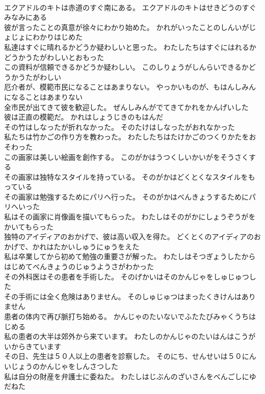 \documentclass[8pt]{extreport}
\begin{document}
\begin{CJK}{UTF8}{min}
\\	エクアドルのキトは赤道のすぐ南にある。	エクアドルのキトはせきどうのすぐみなみにある 
\\	彼が言ったことの真意が徐々にわかり始めた。	かれがいったことのしんいがじょじょにわかりはじめた 
\\	私達はすぐに晴れるかどうか疑わしいと思った。	わたしたちはすぐにはれるかどうかうたがわしいとおもった 
\\	この資料が信頼できるかどうか疑わしい。	このしりょうがしんらいできるかどうかうたがわしい 
\\	厄介者が、模範市民になることはあまりない。	やっかいものが、もはんしみんになることはあまりない 
\\	全市民が出てきて彼を歓迎した。	ぜんしみんがでてきてかれをかんげいした 
\\	彼は正直の模範だ。	かれはしょうじきのもはんだ 
\\	その竹はしなったが折れなかった。	そのたけはしなったがおれなかった 
\\	私たちは竹かごの作り方を教わった。	わたしたちはたけかごのつくりかたをおそわった 
\\	この画家は美しい絵画を創作する。	このがかはうつくしいかいがをそうさくする 
\\	その画家は独特なスタイルを持っている。	そのがかはどくとくなスタイルをもっている 
\\	その画家は勉強するためにパリへ行った。	そのがかはべんきょうするためにパリへいった 
\\	私はその画家に肖像画を描いてもらった。	わたしはそのがかにしょうぞうがをかいてもらった 
\\	独特のアイディアのおかげで、彼は高い収入を得た。	どくとくのアイディアのおかげで、かれはたかいしゅうにゅうをえた 
\\	私は卒業してから初めて勉強の重要さが解った。	わたしはそつぎょうしたからはじめてべんきょうのじゅうようさがわかった 
\\	その外科医はその患者を手術した。	そのげかいはそのかんじゃをしゅじゅつした 
\\	その手術には全く危険はありません。	そのしゅじゅつはまったくきけんはありません 
\\	患者の体内で再び脈打ち始める。	かんじゃのたいないでふたたびみゃくうちはじめる 
\\	私の患者の大半は郊外から来ています。	わたしのかんじゃのたいはんはこうがいからきています 
\\	その日、先生は５０人以上の患者を診察した。	そのにち、せんせいは５０にんいじょうのかんじゃをしんさつした 
\\	私は自分の財産を弁護士に委ねた。	わたしはじぶんのざいさんをべんごしにゆだねた 

\end{CJK}
\end{document}
